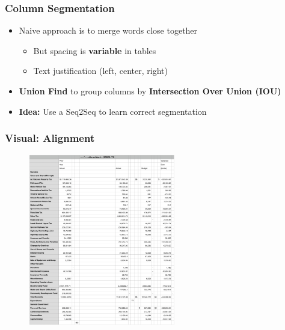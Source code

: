 \documentclass[usenames,dvipsnames]{beamer}
\begin{document}
\begin{frame}
  \frametitle{Column Segmentation}
  \begin{itemize}
    \item Naive approach is to merge words close together
    \begin{itemize}
      \item But spacing is \textbf{variable} in tables
      \item Text justification (left, center, right)
    \end{itemize}
    \item \textbf{Union Find} to group columns by \textbf{Intersection Over Union (IOU)}
    \pause
    \item \textbf{Idea:} Use a Seq2Seq to learn correct segmentation
  \end{itemize}
\end{frame}

\begin{frame}
  \frametitle{Visual: Alignment}
  \begin{figure}
    \includegraphics[height=7.5cm, valign=c]{assets/result1}
  \end{figure}
\end{frame}
\end{document}
